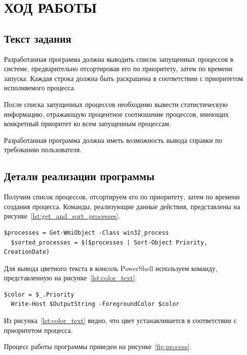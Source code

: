 \section{ХОД РАБОТЫ}

\subsection{Текст задания}

Разработанная программа должна выводить список запущенных процессов в системе,
предварительно отсортировав его по приоритету, затем по времени запуска. Каждая строка
должна быть раскрашена в соответствии с приоритетом исполняемого процесса.

После списка запущенных процессов необходимо вывести статистическую информацию,
отражающую процентное соотношение процессов, имеющих конкретный приоритет
ко всем запущенным процессам.

Разработанная программа должна иметь возможность вывода справки по требованию пользователя.

\subsection{Детали реализации программы}

Получим список процессов, отсортируем его по приоритету, затем по времени создания процесса.
Команды, реализующие данные действия, представлены на рисунке~\ref{lst:get_and_sort_processes}.

\begin{lstlisting}[caption=Получение и сортировка списка запущенных процессов, label=lst:get_and_sort_processes]
  $processes = Get-WmiObject -Class win32_process
  $sorted_processes = $($processes | Sort-Object Priority, CreationDate)
\end{lstlisting}

Для вывода цветного текста в консоль PowerShell используем команду, представленную на рисунке~\ref{lst:color_text}.
\begin{lstlisting}[caption=Вывод цветного текста в консоль PowerShell, label=lst:color_text]
  $color = $_.Priority
  Write-Host $OutputString -ForegroundColor $color
\end{lstlisting}

Из рисунка~\ref{lst:color_text} видно, что цвет устанавливается в соответствии с приоритетом процесса.

\newpage
Процесс работы программы приведен на рисунке~\ref{fig:process}.

